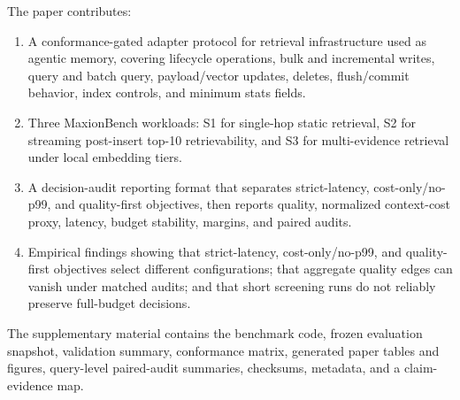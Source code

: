 The paper contributes:
\begin{enumerate}[leftmargin=*]
  \item A conformance-gated adapter protocol for retrieval infrastructure used as agentic memory, covering lifecycle operations, bulk and incremental writes, query and batch query, payload/vector updates, deletes, flush/commit behavior, index controls, and minimum stats fields.
  \item Three MaxionBench workloads: S1 for single-hop static retrieval, S2 for streaming post-insert top-10 retrievability, and S3 for multi-evidence retrieval under local embedding tiers.
  \item A decision-audit reporting format that separates strict-latency, cost-only/no-p99, and quality-first objectives, then reports quality, normalized context-cost proxy, \maxrowp latency, budget stability, margins, and paired audits.
  \item Empirical findings showing that strict-latency, cost-only/no-p99, and quality-first objectives select different configurations; that aggregate quality edges can vanish under matched audits; and that short screening runs do not reliably preserve full-budget decisions.
\end{enumerate}

The supplementary material contains the benchmark code, frozen evaluation snapshot, validation summary, conformance matrix, generated paper tables and figures, query-level paired-audit summaries, checksums, \hotpotmaxionbench{} metadata, and a claim-evidence map.
